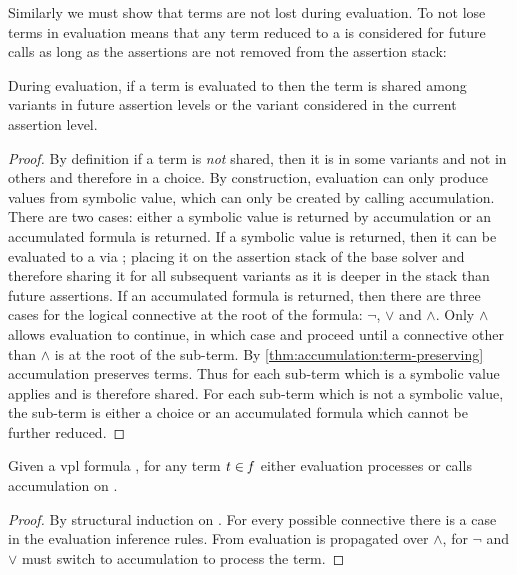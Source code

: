 Similarly we must show that terms are not lost during evaluation. To not lose
terms in evaluation means that any term reduced to a \unit{} is considered for
future  calls as long as the assertions are not removed from the
assertion stack:

\begin{lemma}
  During evaluation, if a term is evaluated to \unit{} then the term is shared
  among variants in future assertion levels or the variant considered in the
  current assertion level.
\end{lemma}
%
\begin{proof}
  By definition if a term is \emph{not} shared, then it is in some variants and
  not in others and therefore in a choice. By construction, evaluation can only
  produce \unit{} values from symbolic value, which can only be created by
  calling accumulation. There are two cases: either a symbolic value is returned
  by accumulation or an accumulated formula is returned. If a symbolic value is
  returned, then it can be evaluated to a \unit{} via \evSym{}; placing it on
  the assertion stack of the base solver and therefore sharing it for all
  subsequent variants as it is deeper in the stack than future assertions. If an
  accumulated formula is returned, then there are three cases for the logical
  connective at the root of the formula: $\neg$, $\vee$ and $\wedge$. Only
  $\wedge$ allows evaluation to continue, in which case \evSym{} and \evAnd{}
  proceed until a connective other than $\wedge$ is at the root of the sub-term.
  By \autoref{thm:accumulation:term-preserving} accumulation preserves terms.
  Thus for each sub-term which is a symbolic value \evSym{} applies and is
  therefore shared. For each sub-term which is not a symbolic value, the
  sub-term is either a choice or an accumulated formula which cannot be further
  reduced.
\end{proof}

\begin{lemma}
  \label{lemma:ev:all-terms}
  Given a \ac{vpl} formula \fV{}, for any term $\mathit{t}{} \in \mathit{f}{}$ either
  evaluation processes \tV{} or calls accumulation on \tV{}.
\end{lemma}
%
\begin{proof}
  By structural induction on \tV{}. For every possible connective there is a
  case in the evaluation inference rules. From \evAnd{} evaluation is
  propagated over $\wedge$, for $\neg$ and $\vee$ must switch to accumulation to
  process the term.
\end{proof}


